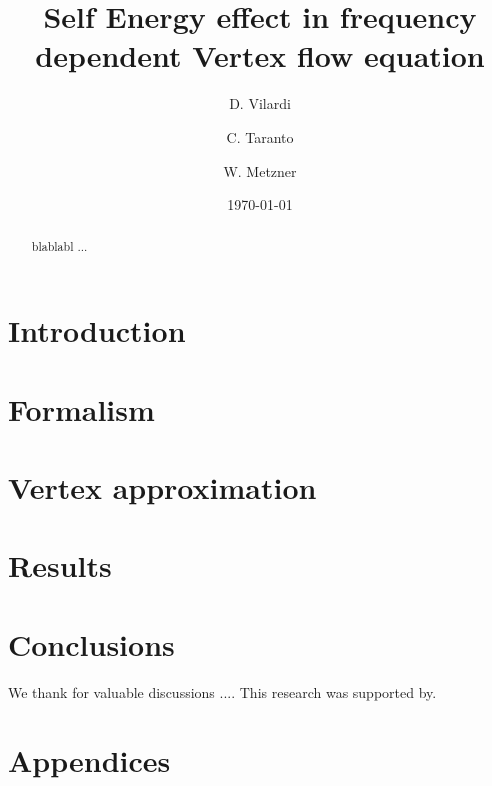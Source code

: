 \documentclass[aps,prb,twocolumn,showpacs,superscriptaddress,groupedaddress]{revtex4}
\begin{document}
\title{Self Energy effect in frequency dependent Vertex flow equation}

\author {D. Vilardi}
\author{C. Taranto}
\author{W. Metzner}

\date{\today}

\begin{abstract}
blablabl ...
\end{abstract}

\pacs{}
\maketitle

\section{Introduction}
\label{sec:introduction}


\section{Formalism}
\label{sec:formalism}

\section{Vertex approximation}
\label{sec:vertex}


\section{Results}
\label{sec:results}


\section{Conclusions}
\label{sec:conclusions}


\begin{acknowledgments}
We thank  for valuable discussions .... This research was supported by.
\end{acknowledgments}

\section{Appendices}
\label{sec:appendices}




\end{document}
